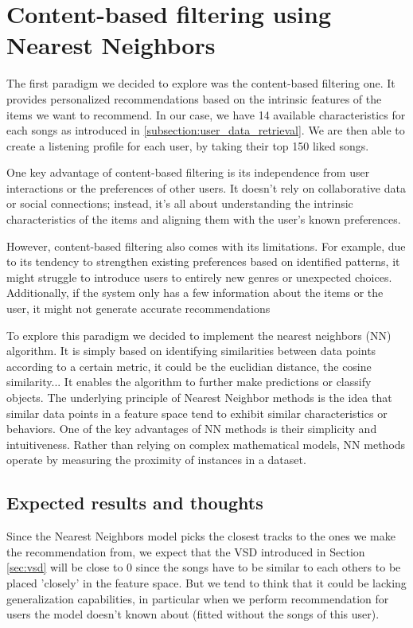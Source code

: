\chapter{Content-based filtering using Nearest Neighbors} \label{chap:nn}

The first paradigm we decided to explore was the content-based filtering one. It provides personalized recommendations based on the intrinsic features of the items we want to recommend. In our case, we have 14 available characteristics for each songs as introduced in \ref{subsection:user_data_retrieval}. We are then able to create a listening profile for each user, by taking their top 150 liked songs.

One key advantage of content-based filtering is its independence from user interactions or the preferences of other users. It doesn't rely on collaborative data or social connections; instead, it's all about understanding the intrinsic characteristics of the items and aligning them with the user's known preferences.

However, content-based filtering also comes with its limitations. For example, due to its tendency to strengthen existing preferences based on identified patterns, it might struggle to introduce users to entirely new genres or unexpected choices. Additionally, if the system only has a few information about the items or the user, it might not generate accurate recommendations

To explore this paradigm we decided to implement the nearest neighbors (NN) algorithm. It is simply based on identifying similarities between data points according to a certain metric, it could be the euclidian distance, the cosine similarity... It enables the algorithm to further make predictions or classify objects. The underlying principle of Nearest Neighbor methods is the idea that similar data points in a feature space tend to exhibit similar characteristics or behaviors. One of the key advantages of NN methods is their simplicity and intuitiveness. Rather than relying on complex mathematical models, NN methods operate by measuring the proximity of instances in a dataset.

\section{Expected results and thoughts} \label{sec:nn_excpected}
Since the Nearest Neighbors model picks the closest tracks to the ones we make the recommendation from, we expect that the VSD introduced in Section \ref{sec:vsd} will be close to 0 since the songs have to be similar to each others to be placed 'closely' in the feature space. But we tend to think that it could be lacking generalization capabilities, in particular when we perform recommendation for users the model doesn't known about (fitted without the songs of this user).

